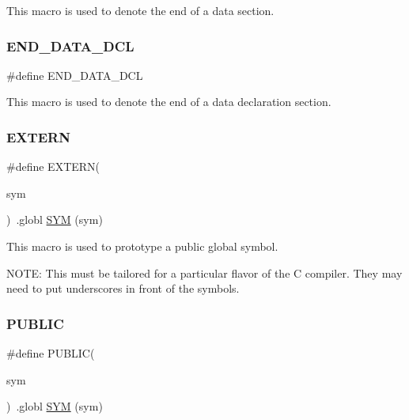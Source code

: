 This macro is used to denote the end of a data section. \mbox{\label{group__RTEMSScoreCPUlm32ASM_gaba5951c6a7df52e7c13d07a6823e9758}} 
\subsubsection{\texorpdfstring{END\_DATA\_DCL}{END\_DATA\_DCL}}
{\footnotesize\ttfamily \#define E\+N\+D\+\_\+\+D\+A\+T\+A\+\_\+\+D\+CL}

This macro is used to denote the end of a data declaration section. \mbox{\label{group__RTEMSScoreCPUlm32ASM_ga9808b867f8d1bd54d78548a5cd5dc415}} 
\subsubsection{\texorpdfstring{EXTERN}{EXTERN}}
{\footnotesize\ttfamily \#define E\+X\+T\+E\+RN(\begin{DoxyParamCaption}\item[{}]{sym }\end{DoxyParamCaption})~.globl \mbox{\hyperlink{group__RTEMSScoreCPUx86-64ASM_gafe05d428a5f345f51fb591debb815325}{S\+YM}} (sym)}

This macro is used to prototype a public global symbol.

N\+O\+TE\+: This must be tailored for a particular flavor of the C compiler. They may need to put underscores in front of the symbols. \mbox{\label{group__RTEMSScoreCPUlm32ASM_ga5e536c0e80cb78da6a74541281111e40}} 
\subsubsection{\texorpdfstring{PUBLIC}{PUBLIC}}
{\footnotesize\ttfamily \#define P\+U\+B\+L\+IC(\begin{DoxyParamCaption}\item[{}]{sym }\end{DoxyParamCaption})~.globl \mbox{\hyperlink{group__RTEMSScoreCPUx86-64ASM_gafe05d428a5f345f51fb591debb815325}{S\+YM}} (sym)}

